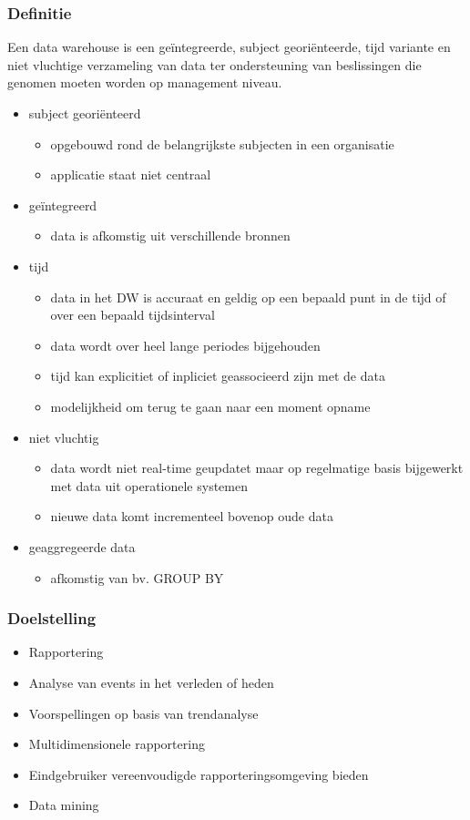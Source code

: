 \documentclass[a4paper,12pt]{article}
\begin{document}
\subsubsection{Definitie}
Een data warehouse is een geïntegreerde, subject georiënteerde, tijd variante en niet vluchtige verzameling van data ter ondersteuning van beslissingen die genomen moeten worden op management niveau.
\begin{itemize}
\item subject georiënteerd
	\begin{itemize}
	\item opgebouwd rond de belangrijkste subjecten in een organisatie
	\item applicatie staat niet centraal
	\end{itemize}
\item geïntegreerd
	\begin{itemize}
	\item data is afkomstig uit verschillende bronnen
	\end{itemize}
\item tijd
	\begin{itemize}
	\item data in het DW is accuraat en geldig op een bepaald punt in de tijd of over een bepaald tijdsinterval
	\item data wordt over heel lange periodes bijgehouden
	\item tijd kan explicitiet of inpliciet geassocieerd zijn met de data
	\item modelijkheid om terug te gaan naar een moment opname
	\end{itemize}
\item niet vluchtig
	\begin{itemize}
	\item data wordt niet real-time geupdatet maar op regelmatige basis bijgewerkt met data uit operationele systemen
	\item nieuwe data komt incrementeel bovenop oude data
	\end{itemize}
\item geaggregeerde data
	\begin{itemize}
	\item afkomstig van bv. GROUP BY
	\end{itemize}
\end{itemize}

\subsubsection{Doelstelling}
\begin{itemize}
\item Rapportering
\item Analyse van events in het verleden of heden
\item Voorspellingen op basis van trendanalyse
\item Multidimensionele rapportering
\item Eindgebruiker vereenvoudigde rapporteringsomgeving bieden
\item Data mining
\end{itemize}
\end{document}
